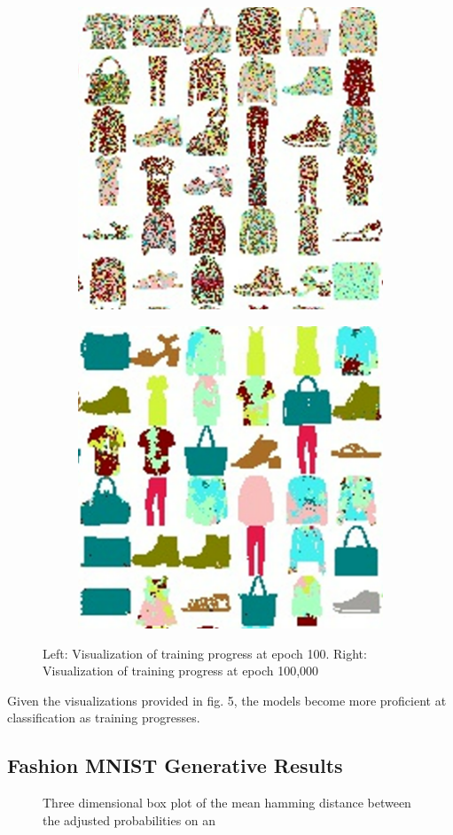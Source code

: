 \documentclass[conference]{IEEEtran}
\begin{document}
\begin{figure}
    \begin{subfigure}
      \centering
      \includegraphics[width=.47\linewidth]{resources/ep100_class.png}
    \end{subfigure}%
    \begin{subfigure}
      \centering
      \includegraphics[width=.47\linewidth]{resources/ep100000_class.png}
    \end{subfigure}
    \caption{Left: Visualization of training progress at epoch 100. Right: Visualization of training progress at epoch 100,000}
    \label{fig:fig}
\end{figure}

Given the visualizations provided in fig. 5, the models become more proficient at classification as training progresses. 

\subsection{Fashion MNIST Generative Results}

\begin{figure}[htbp]
\caption{Three dimensional box plot of the mean hamming distance between the adjusted probabilities on an }
\end{figure}
\end{document}
